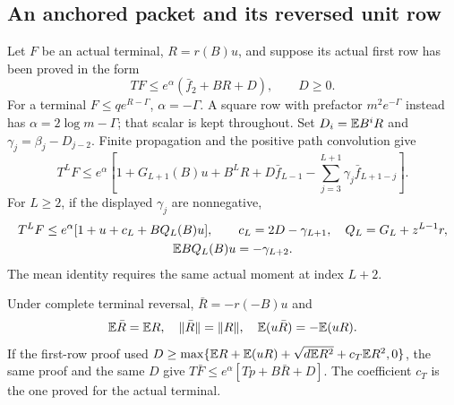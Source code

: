 \subsection{An anchored packet and its reversed unit row}
\label{sec:odd-common:q-packet}

\begin{lemma}
\label{lem:odd-common:q-packet}
Let \(F\) be an actual terminal, \(R=r(B)u\), and suppose its actual
first row has been proved in the form
\begin{equation}\label{eq:odd-common:q-first-row}
 TF\le e^{\alpha}(\bar f_2+BR+D),\qquad D\ge0.
\end{equation}
For a terminal \(F\le q e^{R-\Gamma}\), \(\alpha=-\Gamma\).
A square row with prefactor \(m^2e^{-\Gamma}\) instead has
\(\alpha=2\log m-\Gamma\); that scalar is kept throughout.
Set \(D_i=\mathbb E B^iR\) and \(\gamma_j=\beta_j-D_{j-2}\).
Finite propagation and the positive path convolution give
\begin{equation}\label{eq:odd-common:q-finite}
 T^LF\le e^{\alpha}\left[
 1+G_{L+1}(B)u+B^LR+D\bar f_{L-1}
       -\sum_{j=3}^{L+1}\gamma_j\bar f_{L+1-j}\right].
\end{equation}
For \(L\ge2\), if the displayed \(\gamma_j\) are nonnegative,
\begin{equation}\label{eq:odd-common:q-long}
\begin{gathered}
 T^LF\le e^{\alpha}[1+u+c_L+BQ_L(B)u],\qquad
 c_L=2D-\gamma_{L+1},\quad Q_L=G_L+z^{L-1}r,\\
 \mathbb E BQ_L(B)u=-\gamma_{L+2}.
\end{gathered}
\end{equation}
The mean identity requires the same actual moment at index \(L+2\).

Under complete terminal reversal, \(\bar R=-r(-B)u\) and
\begin{equation}\label{eq:odd-common:q-reversal}
 \mathbb E\bar R=\mathbb E R,\quad\|\bar R\|=\|R\|,
 \quad\mathbb E(u\bar R)=-\mathbb E(uR).
\end{equation}
If the first-row proof used
\(D\ge\max\{\mathbb E R+\mathbb E(uR)+\sqrt{d\mathbb E R^2}+c_T\mathbb E R^2,0\}\),
the same proof and the same \(D\) give
\(T\bar F\le e^{\alpha}[Tp+B\bar R+D]\).
The coefficient \(c_T\) is the one proved for the actual terminal.


\end{lemma}
